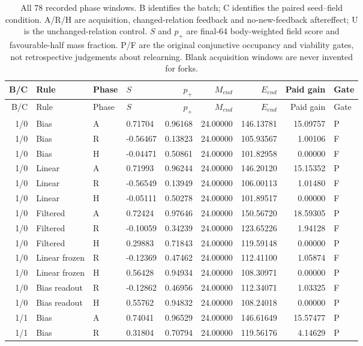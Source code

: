 \begin{longtable}{rlllrrrrl}
\caption{All 78 recorded phase windows. B identifies the batch; C identifies the paired seed--field condition. A/R/H are acquisition, changed-relation feedback and no-new-feedback aftereffect; U is the unchanged-relation control. $S$ and $p_+$ are final-64 body-weighted field score and favourable-half mass fraction. P/F are the original conjunctive occupancy and viability gates, not retrospective judgements about relearning. Blank acquisition windows are never invented for forks.}\label{tab:gain-phases}\\
\toprule
B/C & Rule & Phase & $S$ & $p_+$ & $M_{end}$ & $E_{end}$ & Paid gain & Gate \\
\midrule
\endfirsthead
\toprule
B/C & Rule & Phase & $S$ & $p_+$ & $M_{end}$ & $E_{end}$ & Paid gain & Gate \\
\midrule
\endhead
1/0 & Bias & A & 0.71704 & 0.96168 & 24.00000 & 146.13781 & 15.09757 & P \\
1/0 & Bias & R & -0.56467 & 0.13823 & 24.00000 & 105.93567 & 1.00106 & F \\
1/0 & Bias & H & -0.04471 & 0.50861 & 24.00000 & 101.82958 & 0.00000 & F \\
1/0 & Linear & A & 0.71993 & 0.96244 & 24.00000 & 146.20120 & 15.15352 & P \\
1/0 & Linear & R & -0.56549 & 0.13949 & 24.00000 & 106.00113 & 1.01480 & F \\
1/0 & Linear & H & -0.05111 & 0.50278 & 24.00000 & 101.89517 & 0.00000 & F \\
1/0 & Filtered & A & 0.72424 & 0.97646 & 24.00000 & 150.56720 & 18.59305 & P \\
1/0 & Filtered & R & -0.10059 & 0.34239 & 24.00000 & 123.65226 & 1.94128 & F \\
1/0 & Filtered & H & 0.29883 & 0.71843 & 24.00000 & 119.59148 & 0.00000 & P \\
1/0 & Linear frozen & R & -0.12369 & 0.47462 & 24.00000 & 112.41100 & 1.05874 & F \\
1/0 & Linear frozen & H & 0.56428 & 0.94934 & 24.00000 & 108.30971 & 0.00000 & P \\
1/0 & Bias readout & R & -0.12862 & 0.46956 & 24.00000 & 112.34071 & 1.03325 & F \\
1/0 & Bias readout & H & 0.55762 & 0.94832 & 24.00000 & 108.24018 & 0.00000 & P \\
1/1 & Bias & A & 0.74041 & 0.96529 & 24.00000 & 146.61649 & 15.57477 & P \\
1/1 & Bias & R & 0.31804 & 0.70794 & 24.00000 & 119.56176 & 4.14629 & P \\

\end{longtable}

